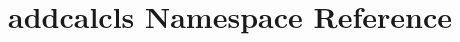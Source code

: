 \hypertarget{namespaceaddcalcls}{\section{addcalcls Namespace Reference}
\label{namespaceaddcalcls}
}
